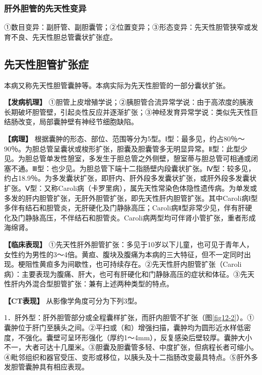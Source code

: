 \subsubsection{肝外胆管的先天性变异}

①数目变异：副肝管、副胆囊管；②位置变异；③形态变异：先天性胆管狭窄或发育不良、先天性胆总管囊状扩张症。

\subsection{先天性胆管扩张症}

本病又称先天性胆管囊肿等。本病实际为先天性胆管的一部分囊状扩张。

\textbf{【发病机理】}
①胆管上皮增殖学说；②胰胆管合流异常学说：由于高浓度的胰液长期破坏胆管壁，引起炎性反应并逐渐扩张；③神经发育异常学说：类似先天性巨结肠改变，局部囊肿壁有神经节细胞缺陷。

\textbf{【病理】}
根据囊肿的形态、部位、范围等分为5型。Ⅰ型：最多见，约占80％～90％。为胆总管呈囊状或梭形扩张，胆囊及胆囊管多无明显异常。Ⅱ型：此型少见。为胆总管单发性憩室，多发生于胆总管之外侧壁，憩室蒂与胆总管可相通或闭塞不通。Ⅲ型：也少见。为胆总管下端十二指肠壁内段囊状扩张。Ⅳ型：较多见，约占18.9％。为多发囊状扩张，即肝内、肝外段多发囊状扩张，或肝外段多发囊状扩张。Ⅴ型：又称Caroli病（卡罗里病），属先天性常染色体隐性遗传病。为单发或多发的肝内胆管扩张，无肝外胆管扩张，即先天性肝内胆管扩张。其中Caroli病Ⅰ型多伴有结石和胆管炎，无肝硬化及门静脉高压；Caroli病Ⅱ型非常少见，伴有肝硬化及门静脉高压，不伴结石和胆管炎。Caroli病两型均可伴肾小管扩张，重者形成海绵肾。

\textbf{【临床表现】}
①先天性肝外胆管扩张：多见于10岁以下儿童，也可见于青年人，女性约为男性的3～4倍。黄疸、腹块及腹痛为本病的三大特征，但不一定同时出现。梗阻性黄疸多为间歇性，也可持续存在。②先天性肝内胆管扩张（Caroli病）：主要表现为腹痛、肝大，也可有肝硬化和门静脉高压的症状和体征。③先天性肝内外混合型胆管扩张：兼有上述两种类型的特点。

\textbf{【CT表现】} 从影像学角度可分为下列3型。

1．肝外型：肝外胆管部分或全程囊样扩张，而肝内胆管不扩张（图\ref{fig12-2}）。①囊肿位于肝门至胰头之间。②平扫或（和）增强扫描，囊肿均为圆形近水样低密度，不强化。囊壁可呈环形强化（厚约1～4mm），反复感染后壁较厚。囊肿大小不一，大者可达十几厘米。③胆囊及胆囊管多轻、中度扩张，但病程长者可缩小。④毗邻组织和器官受压、变形或移位，以胰头及十二指肠改变最具特点。⑤肝外多发胆管囊肿具有相应表现。

